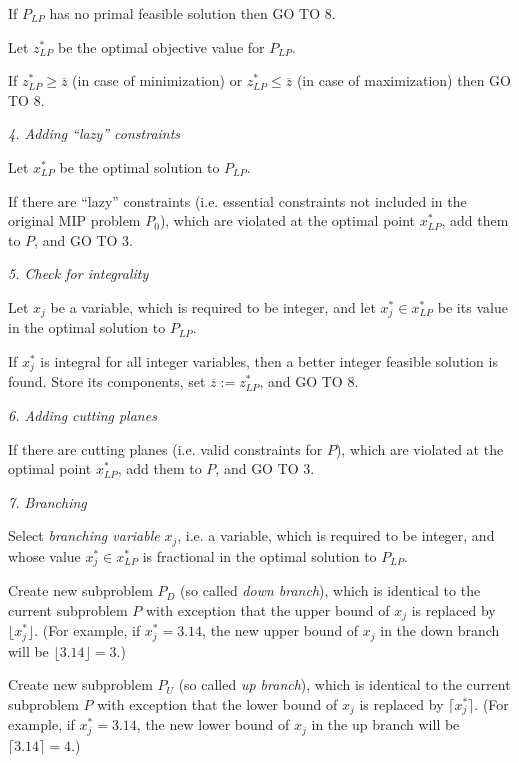 If $P_{LP}$ has no primal feasible solution then GO TO 8.

Let $z_{LP}^*$ be the optimal objective value for $P_{LP}$.

If $z_{LP}^*\geq\overline{z}$ (in case of minimization) or
$z_{LP}^*\leq\overline{z}$ (in case of maximization) then GO TO 8.

\medskip

{\it 4. Adding ``lazy'' constraints}

Let $x_{LP}^*$ be the optimal solution to $P_{LP}$.

If there are ``lazy'' constraints (i.e. essential constraints not
included in the original MIP problem $P_0$), which are violated at the
optimal point $x_{LP}^*$, add them to $P$, and GO TO 3.

\medskip

{\it 5. Check for integrality}

Let $x_j$ be a variable, which is required to be integer, and let
$x_j^*\in x_{LP}^*$ be its value in the optimal solution to $P_{LP}$.

If $x_j^*$ is integral for all integer variables, then a better integer
feasible solution is found. Store its components, set
$\overline{z}:=z_{LP}^*$, and GO TO 8.

\medskip

{\it 6. Adding cutting planes}

If there are cutting planes (i.e. valid constraints for $P$), which are
violated at the optimal point $x_{LP}^*$, add them to $P$, and GO TO 3.

\medskip

{\it 7. Branching}

Select {\it branching variable} $x_j$, i.e. a variable, which is
required to be integer, and whose value $x_j^*\in x_{LP}^*$ is
fractional in the optimal solution to $P_{LP}$.

Create new subproblem $P_D$ (so called {\it down branch}), which is
identical to the current subproblem $P$ with exception that the upper
bound of $x_j$ is replaced by $\lfloor x_j^*\rfloor$. (For example,
if $x_j^*=3.14$, the new upper bound of $x_j$ in the down branch will
be $\lfloor 3.14\rfloor=3$.)

Create new subproblem $P_U$ (so called {\it up branch}), which is
identical to the current subproblem $P$ with exception that the lower
bound of $x_j$ is replaced by $\lceil x_j^*\rceil$. (For example, if
$x_j^*=3.14$, the new lower bound of $x_j$ in the up branch will be
$\lceil 3.14\rceil=4$.)

